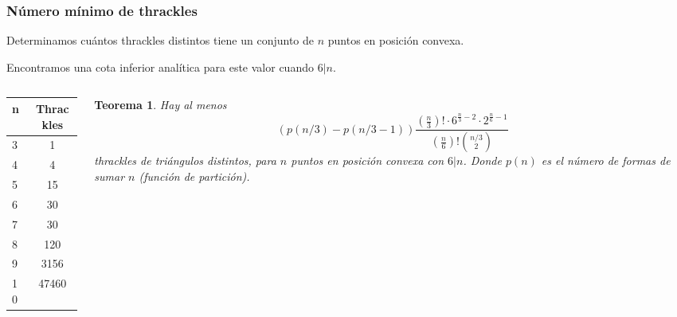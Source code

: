 \documentclass{beamer}
\newtheorem{teo}{Teorema}
\begin{document}
\begin{frame}
  \frametitle{Número mínimo de thrackles}
  Determinamos cuántos thrackles distintos tiene un conjunto de $n$ puntos en
  posición convexa.

  Encontramos una cota inferior analítica para este valor cuando $6|n$.\\
  \begin{columns}
    \begin{column}{0.3\textwidth}
      \begin{center}
        \begin{tabular}{| l | c |}
          \hline
          \textbf{n} & \textbf{Thrackles} \\ \hline
          3 & 1 \\ \hline 
          4 & 4 \\ \hline
          5 & 15 \\ \hline
          6 & 30 \\ \hline
          7 & 30 \\ \hline
          8 & 120 \\ \hline
          9 & 3156 \\ \hline
          10 & 47460 \\ \hline
        \end{tabular}
      \end{center}
    \end{column}
    \begin{column}{0.7\textwidth}
      \begin{teo}
        Hay al menos
        $$(p(n/3)-p(n/3-1))\frac{(\frac{n}{3})!\cdot6^{\frac{n}{3}-2}\cdot2^{\frac{n}{6}-1}}{(\frac{n}{6})!\binom{n/3}{2}}$$
        thrackles de triángulos distintos, para $n$ puntos en posición
        convexa con $6|n$. Donde $p(n)$ es el número de formas de sumar $n$
        (función de partición).
      \end{teo}
    \end{column}
  \end{columns}
\end{frame}
\end{document}
